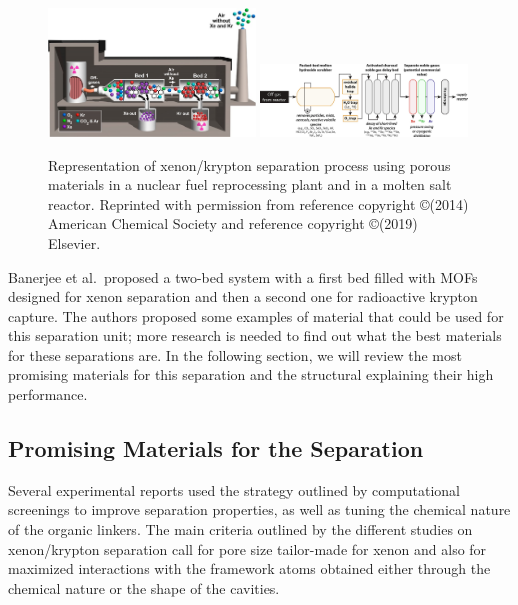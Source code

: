 \documentclass[main.tex]{subfiles}
\begin{document}
\begin{figure}[ht]
  \includegraphics[width=0.49\textwidth]{figures/1-screening/Kr_treatment.jpg}
  \includegraphics[width=0.49\textwidth]{figures/1-screening/MSR_noble_gas.jpg}
  \caption{Representation of xenon/krypton separation process using porous materials in a nuclear fuel reprocessing plant and in a molten salt reactor. Reprinted with permission from reference  copyright \copyright (2014) American Chemical Society and reference  copyright \copyright (2019) Elsevier.}
  \label{fgr:industrial}
\end{figure}

Banerjee et al.\ proposed a two-bed system with a first bed filled with MOFs designed for xenon separation and then a second one for radioactive krypton capture.\cite{Banerjee_2014} The authors proposed some examples of material that could be used for this separation unit; more research is needed to find out what the best materials for these separations are. In the following section, we will review the most promising materials for this separation and the structural explaining their high performance. 


\subsection{Promising Materials for the Separation}

Several experimental reports used the strategy outlined by computational screenings to improve separation properties, as well as tuning the chemical nature of the organic linkers. The main criteria outlined by the different studies on xenon/krypton separation call for pore size tailor-made for xenon and also for maximized interactions with the framework atoms obtained either through the chemical nature or the shape of the cavities. 
\end{document}
